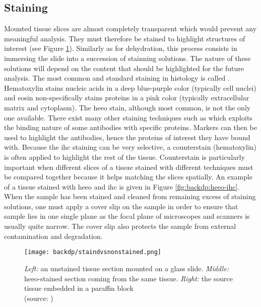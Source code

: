 \subsection{Staining}
\label{ssec:backdp:staining}
Mounted tissue slices are almost completely transparent which would prevent any meaningful analysis. They must therefore be stained to highlight structures of interest (see Figure \ref{fig:backdp:stainedvsnonstained}). Similarly as for dehydration, this process consists in immersing the slide into a succession of stainning solutions. The nature of these solutions will depend on the content that should be highlighted for the future analysis. The most common and standard staining in histology is called . Hematoxylin stains nucleic acids in a deep blue-purple color (typically cell nuclei) and eosin non-specifically stains proteins in a pink color (typically extracellular matrix and cytoplasm). The \acrshort{heeo} stain, although most common, is not the only one available. There exist many other staining techniques such as  which exploits the binding nature of some antibodies with specific proteins. Markers can then be used to highlight the antibodies, hence the proteins of interest they have bound with. Because the \acrshort{ihc} staining can be very selective, a counterstain (\eg hematoxylin) is often applied to highlight   the rest of the tissue. Counterstain is particularly important when different slices of a tissue stained with different techniques must be compared together because it helps matching the slices spatially. An example of a tissue stained with \acrshort{heeo} and \acrshort{ihc} is given in Figure \ref{fig:backdp:heeo-ihc}. When the sample has been stained and cleaned from remaining excess of staining solutions, one must apply a cover slip on the sample in order to ensure that sample lies in one single plane as the focal plane of microscopes and scanners is usually quite narrow. The cover slip also protects the sample from external contamination and degradation. 

\begin{figure}
  \centering
  \texttt{[image: backdp/staindvsnonstained.png]}
  \caption{\textit{Left:} an unstained tissue section mounted on a glass slide. \textit{Middle:} \acrshort{heeo}-stained section coming from the same tissue. \textit{Right:} the source tissue embedded in a paraffin block \\ (source: \cite{abbasi2019all})}
  \label{fig:backdp:stainedvsnonstained}
\end{figure}

